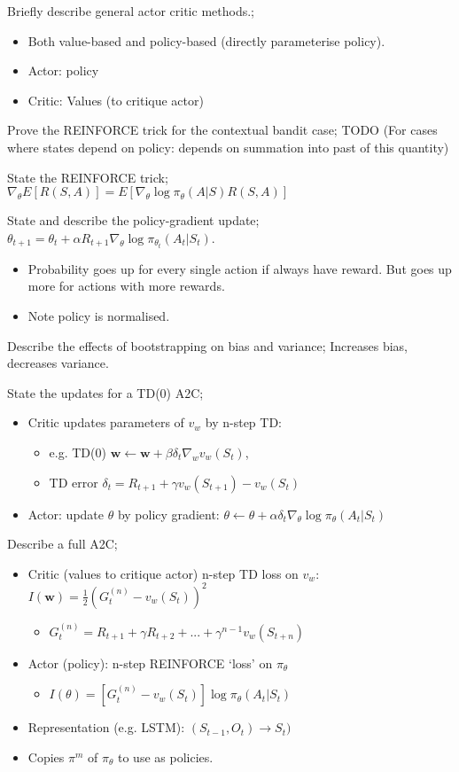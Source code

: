 \documentclass{article}
\begin{document}
Briefly describe general actor critic methods.; \begin{itemize} \item Both value-based and policy-based (directly parameterise policy). \item Actor: policy \item Critic: Values (to critique actor) \end{itemize}

Prove the REINFORCE trick for the contextual bandit case; TODO (For cases where states depend on policy: depends on summation into past of this quantity)

State the REINFORCE trick; $\nabla_\theta E[R(S,A)]=E[\nabla_\theta\log\pi_{\theta}(A|S)R(S,A)]$

State and describe the policy-gradient update; $\theta_{t+1}=\theta_t + \alpha R_{t+1}\nabla_\theta\log\pi_{\theta_t}(A_t|S_t)$. \begin{itemize} \item Probability goes up for every single action if always have reward. But goes up more for actions with more rewards. \item Note policy is normalised. \end{itemize}

Describe the effects of bootstrapping on bias and variance; Increases bias, decreases variance.

State the updates for a TD(0) A2C; \begin{itemize} \item Critic updates parameters of $v_w$ by n-step TD: \begin{itemize} \item e.g. TD(0) $\mathbf{w}\leftarrow\mathbf{w}+\beta\delta_t\nabla_wv_w(S_t)$, \item TD error $\delta_t=R_{t+1}+\gamma v_w(S_{t+1}) - v_w(S_t)$ \end{itemize}  \item Actor: update $\theta$ by policy gradient: $\theta \leftarrow \theta + \alpha\delta_t\nabla_\theta \log \pi_\theta (A_t|S_t)$ \end{itemize}

Describe a full A2C; \begin{itemize} \item Critic (values to critique actor) n-step TD loss on $v_w$: $I(\mathbf{w}) = \frac{1}{2}(G_t^{(n)}-v_w(S_t))^2$ \begin{itemize} \item $G_t^{(n)}=R_{t+1}+\gamma R_{t+2}+...+\gamma^{n-1}v_w(S_{t+n})$ \end{itemize} \item Actor (policy): n-step REINFORCE `loss' on $\pi_\theta$ \begin{itemize} \item $I(\theta) = [G_t^{(n)} - v_w(S_t)]\log\pi_{\theta}(A_t|S_t)$ \end{itemize} \item Representation (e.g. LSTM): $(S_{t-1}, O_t) \rightarrow S_t)$ \item Copies $\pi^m$ of $\pi_\theta$ to use as policies. \end{itemize}
\end{document}

